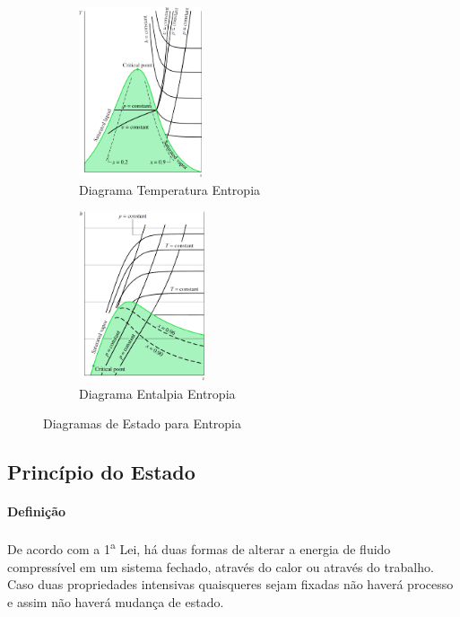 \documentclass{article}
\begin{document}
            \begin{figure}[h]
                \begin{subfigure}[t]{0.5\textwidth}
                    \centering
                    \includegraphics[height = 5cm]{D. Ts Comum.png}
                    \caption{Diagrama Temperatura Entropia}
                \end{subfigure}
                \begin{subfigure}[t]{0.5\textwidth}
                    \centering
                    \includegraphics[height = 5cm]{D. hs Comum.png}
                    \caption{Diagrama Entalpia Entropia}
                \end{subfigure}
                \caption{Diagramas de Estado para Entropia}
            \end{figure}

        \subsection{Princípio do Estado}
            \paragraph{Definição}De acordo com a 1\textsuperscript{a} Lei, há duas formas de alterar a energia de fluido compressível em um sistema fechado, através do calor ou através do trabalho. Caso duas propriedades intensivas quaisqueres sejam fixadas não haverá processo e assim não haverá mudança de estado.
\end{document}
